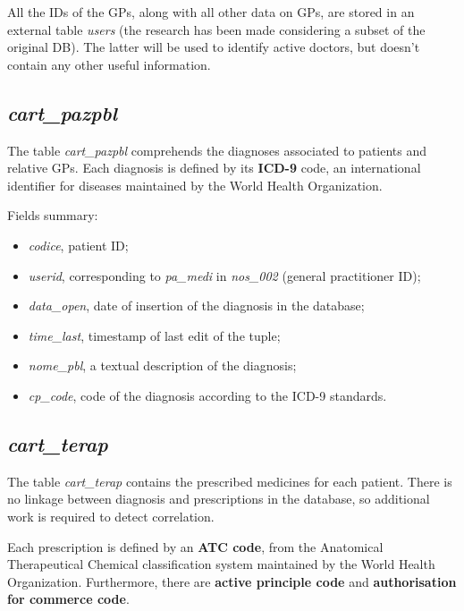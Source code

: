 All the IDs of the GPs, along with all other data on GPs, are stored in an external table \textit{users} (the research has been made considering a subset of the original DB). The latter will be used to identify active doctors, but doesn't contain any other useful information.

\subsection{\textit{cart\_pazpbl}}
The table \textit{cart\_pazpbl} comprehends the diagnoses associated to patients and relative GPs. Each diagnosis is defined by its \textbf{ICD-9} code, an international identifier for diseases maintained by the World Health Organization. 

Fields summary:
\begin{itemize}
	\item \textit{codice}, patient ID;
	\item \textit{userid}, corresponding to \textit{pa\_medi }in \textit{nos\_002 }(general practitioner ID);
	\item \textit{data\_open}, date of insertion of the diagnosis in the database;
	\item \textit{time\_last}, timestamp of last edit of the tuple;
	\item \textit{nome\_pbl}, a textual description of the diagnosis;
	\item \textit{cp\_code}, code of the diagnosis according to the ICD-9 standards.
\end{itemize}

\subsection{\textit{cart\_terap}}
The table \textit{cart\_terap} contains the prescribed medicines for each patient. There is no linkage between diagnosis and prescriptions in the database, so additional work is required to detect correlation.

Each prescription is defined by an\textbf{ ATC code}, from the Anatomical Therapeutical Chemical classification system maintained by the World Health Organization. Furthermore, there are \textbf{active principle code} and \textbf{authorisation for commerce code}.

